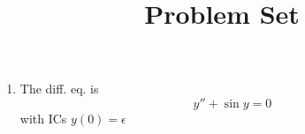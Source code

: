 \documentclass[12pt]{article}
\title{Problem Set \HWNO}
\author{\NAME}
\newcommand{\CLASS}{MATH 558}
\newcommand{\HWNO}{3}
\begin{document}
\begin{enumerate}
    \item The diff. eq. is
    \begin{equation}
         y''+\sin y = 0
     \end{equation}
     with ICs $y(0)=\epsilon$
\end{enumerate}
\end{document}
